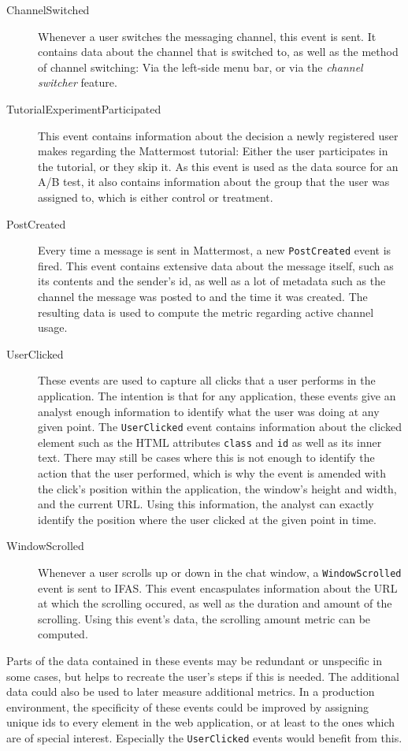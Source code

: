 \begin{description}
\item[ChannelSwitched]
Whenever a user switches the messaging channel, this event is sent.
It contains data about the channel that is switched to, as well as the method of channel switching: Via the left-side menu bar, or via the \emph{channel switcher} feature.
\item[TutorialExperimentParticipated]
This event contains information about the decision a newly registered user makes regarding the Mattermost tutorial:
Either the user participates in the tutorial, or they skip it.
As this event is used as the data source for an A/B test, it also contains information about the group that the user was assigned to, which is either control or treatment.
\item[PostCreated]
Every time a message is sent in Mattermost, a new \texttt{PostCreated} event is fired.
This event contains extensive data about the message itself, such as its contents and the sender's id, as well as a lot of metadata such as the channel the message was posted to and the time it was created.
The resulting data is used to compute the metric regarding active channel usage.
\item[UserClicked]
These events are used to capture all clicks that a user performs in the application.
The intention is that for any application, these events give an analyst enough information to identify what the user was doing at any given point.
The \texttt{UserClicked} event contains information about the clicked element such as the HTML attributes \texttt{class} and \texttt{id} as well as its inner text.
There may still be cases where this is not enough to identify the action that the user performed, which is why the event is amended with the click's position within the application, the window's height and width, and the current URL.
Using this information, the analyst can exactly identify the position where the user clicked at the given point in time.
\item[WindowScrolled]
Whenever a user scrolls up or down in the chat window, a \texttt{WindowScrolled} event is sent to \ac{IFAS}.
This event encaspulates information about the URL at which the scrolling occured, as well as the duration and amount of the scrolling.
Using this event's data, the scrolling amount metric can be computed.
\end{description}

Parts of the data contained in these events may be redundant or unspecific in some cases, but helps to recreate the user's steps if this is needed.
The additional data could also be used to later measure additional metrics.
In a production environment, the specificity of these events could be improved by assigning unique ids to every element in the web application, or at least to the ones which are of special interest.
Especially the \texttt{UserClicked} events would benefit from this.

